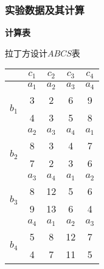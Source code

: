  \subsubsection{实验数据及其计算}

\textbf{计算表}

\begin{margintable}
  \centering
  \caption{拉丁方设计$ABCS$表}
    \begin{tabular}{ccccc}
    \toprule
          & $c_1$ & $c_2$ & $c_3$ & $c_4$ \\
    \midrule
          & $a_1$ & $a_2$ & $a_3$ & $a_4$ \\
    \multirow{2}[0]{*}{$b_1$} & \cellcolor[rgb]{ .949,  .949,  .949}3 & \cellcolor[rgb]{ .949,  .949,  .949}2 & \cellcolor[rgb]{ .949,  .949,  .949}6 & \cellcolor[rgb]{ .949,  .949,  .949}9 \\
          & \cellcolor[rgb]{ .949,  .949,  .949}4 & \cellcolor[rgb]{ .949,  .949,  .949}3 & \cellcolor[rgb]{ .949,  .949,  .949}5 & \cellcolor[rgb]{ .949,  .949,  .949}8 \\
          & $a_2$ & $a_3$ & $a_4$ & $a_1$ \\
    \multirow{2}[0]{*}{$b_2$} & \cellcolor[rgb]{ .949,  .949,  .949}8 & \cellcolor[rgb]{ .949,  .949,  .949}3 & \cellcolor[rgb]{ .949,  .949,  .949}4 & \cellcolor[rgb]{ .949,  .949,  .949}7 \\
          & \cellcolor[rgb]{ .949,  .949,  .949}7 & \cellcolor[rgb]{ .949,  .949,  .949}2 & \cellcolor[rgb]{ .949,  .949,  .949}3 & \cellcolor[rgb]{ .949,  .949,  .949}6 \\
          & $a_3$ & $a_4$ & $a_1$ & $a_2$ \\
    \multirow{2}[0]{*}{$b_3$} & \cellcolor[rgb]{ .949,  .949,  .949}8 & \cellcolor[rgb]{ .949,  .949,  .949}12 & \cellcolor[rgb]{ .949,  .949,  .949}5 & \cellcolor[rgb]{ .949,  .949,  .949}6 \\
          & \cellcolor[rgb]{ .949,  .949,  .949}9 & \cellcolor[rgb]{ .949,  .949,  .949}13 & \cellcolor[rgb]{ .949,  .949,  .949}6 & \cellcolor[rgb]{ .949,  .949,  .949}4 \\
          & $a_4$ & $a_1$ & $a_2$ & $a_3$ \\
    \multirow{2}[0]{*}{$b_4$} & \cellcolor[rgb]{ .949,  .949,  .949}5 & \cellcolor[rgb]{ .949,  .949,  .949}8 & \cellcolor[rgb]{ .949,  .949,  .949}12 & \cellcolor[rgb]{ .949,  .949,  .949}7 \\
          & \cellcolor[rgb]{ .949,  .949,  .949}4 & \cellcolor[rgb]{ .949,  .949,  .949}7 & \cellcolor[rgb]{ .949,  .949,  .949}11 & \cellcolor[rgb]{ .949,  .949,  .949}5 \\
        \bottomrule
    \end{tabular}
\end{margintable}

